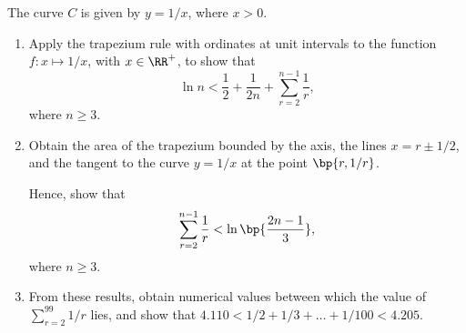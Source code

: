 \begin{problem}
    The curve $C$ is given by $y = 1/x$, where $x > 0$.

    \begin{enumerate}
        \item Apply the trapezium rule with ordinates at unit intervals to the function $f : x \mapsto 1/x$, with $x \in \RR^+$, to show that \[\ln n < \frac12 + \frac1{2n} + \sum_{r=2}^{n-1} \frac1r,\] where $n \geq 3$.
        \item Obtain the area of the trapezium bounded by the axis, the lines $x = r \pm 1/2$, and the tangent to the curve $y = 1/x$ at the point $\bp{r, 1/r}$.

        Hence, show that \[\sum_{r=2}^{n-1} \frac1r < \ln \bp{\frac{2n-1}3},\] where $n \geq 3$.
        \item From these results, obtain numerical values between which the value of $\sum_{r=2}^{99} 1/r$ lies, and show that $4.110 < 1/2 + 1/3 + \ldots + 1/100 < 4.205$.
    \end{enumerate}
\end{problem}
